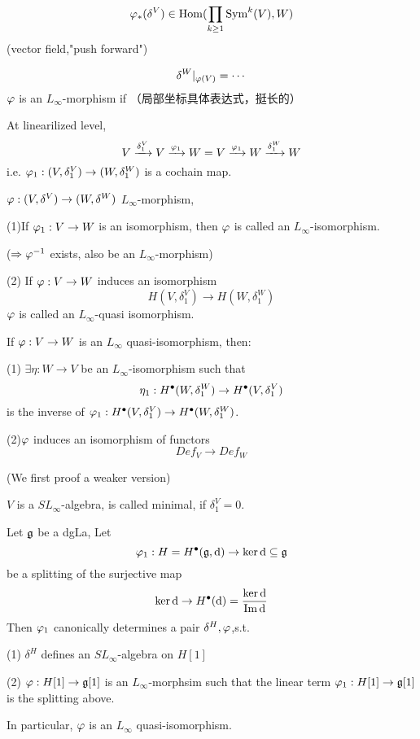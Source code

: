 
$$\varphi_*(\delta^V)\in \operatorname{Hom}(\prod_{k\geq 1}\operatorname{Sym}^k(V),W)$$
(vector field,"push forward")

$$\delta^W|_{\varphi(V)}=\cdots$$
$\varphi$ is an $L_\infty$-morphism if 
（局部坐标具体表达式，挺长的）

At linearilized level, 
$$
  V\xrightarrow{\delta_1^V}V\xrightarrow{\varphi_1}W= V\xrightarrow{\varphi_1}W\xrightarrow{\delta_1^W}W
$$
i.e. $\varphi_1:(V,\delta_1^V)\to (W,\delta_1^W)$ is a cochain map.

\begin{definition}
$\varphi:(V,\delta^V)\to(W,\delta^W)$ $L_\infty$-morphism,

(1)If $\varphi_1:V\to W$ is an isomorphism, then $\varphi$ is called an 
$L_\infty$-isomorphism.

($\Rightarrow\varphi^{-1}$ exists, also be an $L_\infty$-morphism)

(2) If $\varphi:V\to W$ induces an isomorphism 
$$H(V,\delta_1^V)\to H(W,\delta_1^W)$$
$\varphi$ is called an $L_\infty$-quasi isomorphism.
\end{definition}

\begin{thm}
If $\varphi:V\to W$ is an $L_\infty$ quasi-isomorphism, then:

(1) $\exists\eta:W\to V$ be an $L_\infty$-isomorphism such that
$$\eta_1:H^{\bullet}(W,\delta_1^W)\to H^{\bullet}(V,\delta_1^V)$$
is the inverse of $\varphi_1:H^{\bullet}(V,\delta_1^V)\to H^{\bullet}(W,\delta_1^W)$.

(2)$\varphi$ induces an isomorphism of functors 
$$Def_V\to Def_W$$
\end{thm}

(We first proof a weaker version)

\begin{definition}
$V$ is a $SL_\infty$-algebra, is called minimal, if
$\delta_1^V=0$.
\end{definition}

\begin{prop}
Let $\mathfrak{g}$ be a dgLa, Let 
$$\varphi_1:H=H^{\bullet}(\mathfrak{g},\mathrm{d})\to\ker\mathrm{d}\subseteq\mathfrak{g}$$
be a splitting of the surjective map
$$\ker\mathrm{d}\to H^{\bullet}(\mathrm{d})=\frac{\ker\mathrm{d}}{\operatorname{Im}\mathrm{d}}$$
Then $\varphi_1$ canonically determines a pair $\delta^H,\varphi$,s.t.

(1) $\delta^H$ defines an $SL_\infty$-algebra on $H[1]$

(2) $\varphi:H[1]\to\mathfrak{g}[1]$ is an $L_\infty$-morphsim
such that the linear term $\varphi_1:H[1]\to\mathfrak{g}[1]$ is the splitting above.

In particular, $\varphi$ is an $L_\infty$ quasi-isomorphism.
\end{prop}

